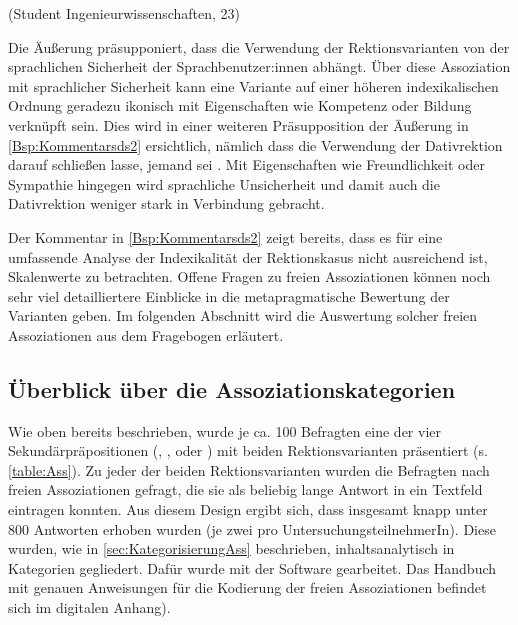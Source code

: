 \begin{exe}
\ex {} (Student Ingenieurwissenschaften, 23)
\label{Bsp:Kommentarsds2}
\end{exe}
Die Äußerung präsupponiert, dass die Verwendung der Rektionsvarianten von der sprachlichen Sicherheit der Sprachbenutzer:innen abhängt. 
Über diese Assoziation mit sprachlicher Sicherheit kann eine Variante auf einer höheren indexikalischen Ordnung geradezu ikonisch mit Eigenschaften wie Kompetenz oder Bildung verknüpft sein. 
Dies wird in einer weiteren Präsupposition der Äußerung in \autoref{Bsp:Kommentarsds2} ersichtlich, nämlich dass die Verwendung der Dativrektion darauf schließen lasse, jemand sei . 
Mit Eigenschaften wie Freundlichkeit oder Sympathie hingegen wird sprachliche Unsicherheit und damit auch die Dativrektion weniger stark in Verbindung gebracht. 

Der Kommentar in \autoref{Bsp:Kommentarsds2} zeigt bereits, dass es für eine umfassende Analyse der Indexikalität der Rektionskasus nicht ausreichend ist, Skalenwerte zu betrachten. 
Offene Fragen zu freien Assoziationen können noch sehr viel detailliertere Einblicke in die metapragmatische Bewertung der Varianten geben. 
Im folgenden Abschnitt wird die Auswertung solcher freien Assoziationen aus dem Fragebogen erläutert. 
\subsection{Überblick über die Assoziationskategorien}
\label{sec:ErgAssKat}
Wie oben bereits beschrieben, wurde je ca. 100 Befragten eine der vier Sekundärpräpositionen (\wegen, \waehrend, \dank{} oder \gegenueber) mit beiden Rektionsvarianten präsentiert (s. \autoref{table:Ass}). 
Zu jeder der beiden Rektionsvarianten wurden die Befragten nach freien Assoziationen gefragt, die sie als beliebig lange Antwort in ein Textfeld eintragen konnten. 
Aus diesem Design ergibt sich, dass insgesamt knapp unter 800 Antworten erhoben wurden (je zwei pro UntersuchungsteilnehmerIn). 
Diese wurden, wie in \autoref{sec:KategorisierungAss} beschrieben, inhaltsanalytisch in Kategorien gegliedert.
Dafür wurde mit der Software \citet{MAXQDA.19892018} gearbeitet. 
Das Handbuch mit genauen Anweisungen für die Kodierung der freien Assoziationen befindet sich im digitalen Anhang).
 
